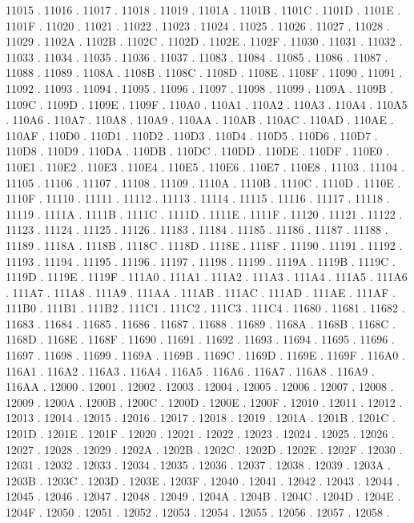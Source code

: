 11015 .
11016 .
11017 .
11018 .
11019 .
1101A .
1101B .
1101C .
1101D .
1101E .
1101F .
11020 .
11021 .
11022 .
11023 .
11024 .
11025 .
11026 .
11027 .
11028 .
11029 .
1102A .
1102B .
1102C .
1102D .
1102E .
1102F .
11030 .
11031 .
11032 .
11033 .
11034 .
11035 .
11036 .
11037 .
11083 .
11084 .
11085 .
11086 .
11087 .
11088 .
11089 .
1108A .
1108B .
1108C .
1108D .
1108E .
1108F .
11090 .
11091 .
11092 .
11093 .
11094 .
11095 .
11096 .
11097 .
11098 .
11099 .
1109A .
1109B .
1109C .
1109D .
1109E .
1109F .
110A0 .
110A1 .
110A2 .
110A3 .
110A4 .
110A5 .
110A6 .
110A7 .
110A8 .
110A9 .
110AA .
110AB .
110AC .
110AD .
110AE .
110AF .
110D0 .
110D1 .
110D2 .
110D3 .
110D4 .
110D5 .
110D6 .
110D7 .
110D8 .
110D9 .
110DA .
110DB .
110DC .
110DD .
110DE .
110DF .
110E0 .
110E1 .
110E2 .
110E3 .
110E4 .
110E5 .
110E6 .
110E7 .
110E8 .
11103 .
11104 .
11105 .
11106 .
11107 .
11108 .
11109 .
1110A .
1110B .
1110C .
1110D .
1110E .
1110F .
11110 .
11111 .
11112 .
11113 .
11114 .
11115 .
11116 .
11117 .
11118 .
11119 .
1111A .
1111B .
1111C .
1111D .
1111E .
1111F .
11120 .
11121 .
11122 .
11123 .
11124 .
11125 .
11126 .
11183 .
11184 .
11185 .
11186 .
11187 .
11188 .
11189 .
1118A .
1118B .
1118C .
1118D .
1118E .
1118F .
11190 .
11191 .
11192 .
11193 .
11194 .
11195 .
11196 .
11197 .
11198 .
11199 .
1119A .
1119B .
1119C .
1119D .
1119E .
1119F .
111A0 .
111A1 .
111A2 .
111A3 .
111A4 .
111A5 .
111A6 .
111A7 .
111A8 .
111A9 .
111AA .
111AB .
111AC .
111AD .
111AE .
111AF .
111B0 .
111B1 .
111B2 .
111C1 .
111C2 .
111C3 .
111C4 .
11680 .
11681 .
11682 .
11683 .
11684 .
11685 .
11686 .
11687 .
11688 .
11689 .
1168A .
1168B .
1168C .
1168D .
1168E .
1168F .
11690 .
11691 .
11692 .
11693 .
11694 .
11695 .
11696 .
11697 .
11698 .
11699 .
1169A .
1169B .
1169C .
1169D .
1169E .
1169F .
116A0 .
116A1 .
116A2 .
116A3 .
116A4 .
116A5 .
116A6 .
116A7 .
116A8 .
116A9 .
116AA .
12000 .
12001 .
12002 .
12003 .
12004 .
12005 .
12006 .
12007 .
12008 .
12009 .
1200A .
1200B .
1200C .
1200D .
1200E .
1200F .
12010 .
12011 .
12012 .
12013 .
12014 .
12015 .
12016 .
12017 .
12018 .
12019 .
1201A .
1201B .
1201C .
1201D .
1201E .
1201F .
12020 .
12021 .
12022 .
12023 .
12024 .
12025 .
12026 .
12027 .
12028 .
12029 .
1202A .
1202B .
1202C .
1202D .
1202E .
1202F .
12030 .
12031 .
12032 .
12033 .
12034 .
12035 .
12036 .
12037 .
12038 .
12039 .
1203A .
1203B .
1203C .
1203D .
1203E .
1203F .
12040 .
12041 .
12042 .
12043 .
12044 .
12045 .
12046 .
12047 .
12048 .
12049 .
1204A .
1204B .
1204C .
1204D .
1204E .
1204F .
12050 .
12051 .
12052 .
12053 .
12054 .
12055 .
12056 .
12057 .
12058 .
